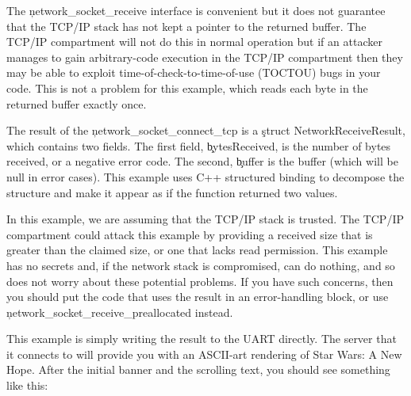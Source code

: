 \codelisting[filename=examples/tcp/tcp.cc,marker=receive,label=lst:tcpreceive,caption="Receiving data from a remote server."]{}

\begin{caution}
The \c{network_socket_receive} interface is convenient but it does not guarantee that the TCP/IP stack has not kept a pointer to the returned buffer.
The TCP/IP compartment will not do this in normal operation but if an attacker manages to gain arbitrary-code execution in the TCP/IP compartment then they may be able to exploit time-of-check-to-time-of-use (TOCTOU) bugs in your code.
This is not a problem for this example, which reads each byte in the returned buffer exactly once.
\end{caution}

The result of the \c{network_socket_connect_tcp} is a \c{struct NetworkReceiveResult}, which contains two fields.
The first field, \c{bytesReceived}, is the number of bytes received, or a negative error code.
The second, \c{buffer} is the buffer (which will be null in error cases).
This example uses C++ structured binding to decompose the structure and make it appear as if the function returned two values.

In this example, we are assuming that the TCP/IP stack is trusted.
The TCP/IP compartment could attack this example by providing a received size that is greater than the claimed size, or one that lacks read permission.
This example has no secrets and, if the network stack is compromised, can do nothing, and so does not worry about these potential problems.
If you have such concerns, then you should put the code that uses the result in an error-handling block, or use \c{network_socket_receive_preallocated} instead.

This example is simply writing the result to the UART directly.
The server that it connects to will provide you with an ASCII-art rendering of Star Wars: A New Hope.
After the initial banner and the scrolling text, you should see something like this:

